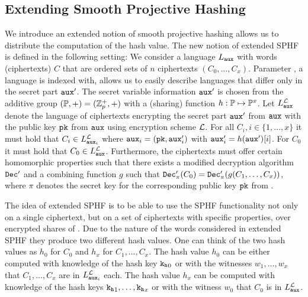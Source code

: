 \subsection{Extending Smooth Projective Hashing}\label{sec:sphff}
We introduce an extended notion of smooth projective hashing allows us to distribute the computation of the hash value.
The new notion of extended \ac{SPHF} is defined in the following setting:
We consider a language $L_\mathtt{aux}$ with words (ciphertexts) $C$ that are ordered sets of $n$ ciphertexts $(C_0,\dots,C_x)$.
Parameter \aux, a language is indexed with, allows us to easily describe languages that differ only in the secret part $\mathtt{aux}'$.
The secret variable information $\mathtt{aux}'$ is chosen from the additive group $(\mathbb{P},+)=(\mathbb{Z}_p^{+},+)$ with a (sharing) function $h:\mathbb{P}\mapsto\mathbb{P}^x$.
Let $L^\mathcal{L}_\mathtt{aux}$ denote the language of ciphertexts encrypting the secret part $\mathtt{aux}'$ from $\mathtt{aux}$ with the public key $\mathtt{pk}$ from $\mathtt{aux}$ using encryption scheme $\mathcal{L}$.
For all $C_i, i\in\{1,\dots,x\}$ it must hold that $C_i\in L^\mathcal{L}_{\mathtt{aux}_i}$ where $\mathtt{aux}_i=(\mathtt{pk},\mathtt{aux}'_i)$ with $\mathtt{aux}'_i=h(\mathtt{aux}')[i]$.
For $C_0$ it must hold that $C_0\in L^\mathcal{L}_{\mathtt{aux}}$.
Furthermore, the ciphertexts must offer certain homomorphic properties such that there exists a modified decryption algorithm $\mathtt{Dec}'$ and a combining function $g$ such that $\mathtt{Dec}'_{\pi}(C_0)=\mathtt{Dec}'_{\pi}(g(C_1,\dots,C_x))$, where $\pi$ denotes the secret key for the corresponding public key $\mathtt{pk}$ from \crs.

The idea of extended \ac{SPHF} is to be able to use the \ac{SPHF} functionality not only on a single ciphertext, but on a set of ciphertexts with specific properties, \ie over encrypted shares of \aux.
Due to the nature of the words considered in extended \ac{SPHF} they produce two different hash values.
One can think of the two hash values as $h_0$ for $C_0$ and  $h_x$ for $C_1,\dots,C_x$.
The hash value $h_0$ can be either computed with knowledge of the hash key $\mathtt{k_h}_0$ or with the witnesses $w_1,\dots,w_x$ that $C_1,\dots,C_x$ are in $L^\mathcal{L}_{\mathtt{aux}_i}$ each.
The hash value $h_x$ can be computed with knowledge of the hash keys $\mathtt{k_h}_1,\dots,\mathtt{k_h}_x$ or with the witness $w_0$ that $C_0$ is in $L^\mathcal{L}_{\mathtt{aux}}$.

